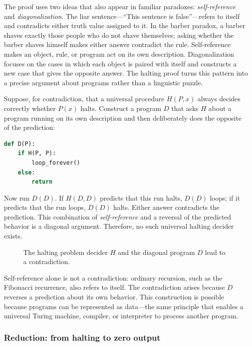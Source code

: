 \documentclass[11pt]{article}
\begin{document}
The proof uses two ideas that also appear in familiar paradoxes:
\emph{self-reference} and \emph{diagonalization}. The liar sentence---``This
sentence is false''---refers to itself and contradicts either truth value
assigned to it. In the barber paradox, a barber shaves exactly those people who
do not shave themselves; asking whether the barber shaves himself makes either
answer contradict the rule. Self-reference makes an object, rule, or program
act on its own description. Diagonalization focuses on the cases in which each
object is paired with itself and constructs a new case that gives the opposite
answer. The halting proof turns this pattern into a precise argument about
programs rather than a linguistic puzzle.

Suppose, for contradiction, that a universal procedure $H(P,x)$ always decides
correctly whether $P(x)$ halts. Construct a program $D$ that asks $H$ about a
program running on its own description and then deliberately does the opposite
of the prediction:
\begin{center}
\begin{minipage}{0.67\linewidth}
\begin{lstlisting}[language=Python]
def D(P):
    if H(P, P):
        loop_forever()
    else:
        return
\end{lstlisting}
\end{minipage}
\end{center}
Now run $D(D)$. If $H(D,D)$ predicts that this run halts, $D(D)$ loops; if it
predicts that the run loops, $D(D)$ halts. Either answer contradicts the
prediction. This combination of \emph{self-reference} and a reversal of the
predicted behavior is a diagonal argument. Therefore, no such universal
halting decider exists.

\begin{figure}[htbp]
  \centering
  
  \caption{The halting problem decider $H$ and the diagonal program $D$ lead to a contradiction.}
\end{figure}

Self-reference alone is not a contradiction: ordinary recursion, such as the
Fibonacci recurrence, also refers to itself. The contradiction arises because
$D$ reverses a prediction about its own behavior. This construction is possible
because programs can be represented as data---the same principle that enables
a universal Turing machine, compiler, or interpreter to process another
program.

\subsubsection*{Reduction: from halting to zero output}
\end{document}
